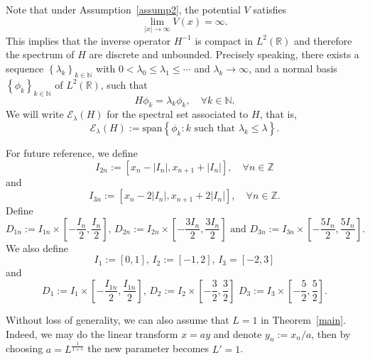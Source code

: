 \documentclass{amsart}
\newcommand\N{\ensuremath{\mathbb{N}}}
\newcommand\R{\ensuremath{\mathbb{R}}}
\newcommand\Z{\ensuremath{\mathbb{Z}}}
\theoremstyle{definition}
\begin{document}
Note that under Assumption~\ref{assump2}, the potential $V$ satisfies
\begin{equation}
	\lim_{|x| \to \infty} V(x)=\infty.
\end{equation}
This implies that the inverse operator $H^{-1}$ is compact in $L^2(\R)$ and therefore the spectrum of $H$ are discrete and unbounded. Precisely speaking, there exists a sequence $\left\{\lambda_k\right\}_{k\in \N}$ with $0<\lambda_0\le \lambda_1\le\cdots $ and $\lambda_k\to \infty$, and a normal basis $\left\{\phi_k\right\} _{k\in \N}$ of $L^2(\R)$, such that 
\begin{equation}
	H\phi_k=\lambda_k \phi_k,\quad \forall k \in \N.
\end{equation}
We will write $\mathcal{E}_\lambda(H)$ for the spectral set associated to $H$, that is,
\begin{equation}
	\mathcal{E}_\lambda(H):=\mathrm{span}\left\{\phi_k: k \text{ such that }\lambda_k\le \lambda\right\}. 
\end{equation}

For future reference, we define
\begin{equation}
	I_{2n}:=\left[ x_{n}-|I_n|,x_{n+1}+|I_{n}| \right] ,\quad \forall  n\in \Z	
\end{equation}
and
\begin{equation}
	I_{3n}:=\left[ x_n-2|I_n|,x_{n+1}+2|I_n| \right] ,\quad \forall n\in \Z.
\end{equation}
Define
\begin{equation}
	D_{1n}:=I_{1n}\times \left[ -\frac{I_{n}}{2},\frac{I_{n}}{2} \right], \, D_{2n}:=I_{2n}\times \left[ -\frac{3I_{n}}{2},\frac{3I_{n}}{2} \right] \text{ and }D_{3n}:=I_{3n}\times \left[ -\frac{5I_{n}}{2},\frac{5I_{n}}{2} \right]. 
\end{equation}
We also define
\begin{equation}
	I_1:=[0,1],\,I_2:=[-1,2],\,I_3=[-2,3]
\end{equation}
and
\begin{equation}
	D_1:=I_1\times \left[ -\frac{I_{1n}}{2},\frac{I_{1n}}{2} \right] ,\, D_2:=I_2\times \left[ -\frac{3}{2},\frac{3}{2} \right] \,\,D_3:=I_3\times\left[ -\frac{5}{2},\frac{5}{2} \right]. 
\end{equation}

Without loss of generality, we can also assume that $L=1$ in Theorem~\ref{main}. Indeed, we may do the linear transform $x=ay$ and denote $y_n:=x_n /a$, then by choosing $\displaystyle a=L^{\frac{1}{1+s}}$ the new parameter becomes $L'=1$. 
\end{document}
